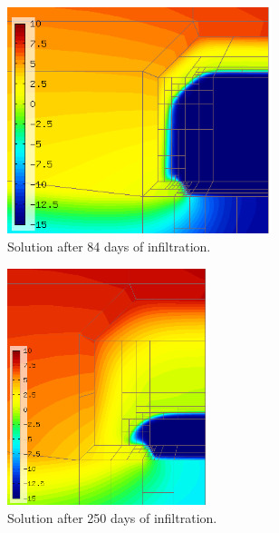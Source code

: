 \documentclass[final,3p,times,twocolumn]{elsarticle}
\begin{document}
\begin{figure}[!htb]
\begin{center}
\includegraphics[height=6.6cm]{solution3-84.png}
\end{center}
\vspace{-4mm}
\caption{Solution after 84 days of infiltration. }
\label{fig:solution3.1}
\end{figure}

\begin{figure}[!htb]
\begin{center}
\includegraphics[height=6.9cm]{solution-3-260.png}
\end{center}
\vspace{-4mm}
\caption{Solution after 250 days of infiltration.}
\label{fig:solution3.2}
\end{figure}


\end{document}

